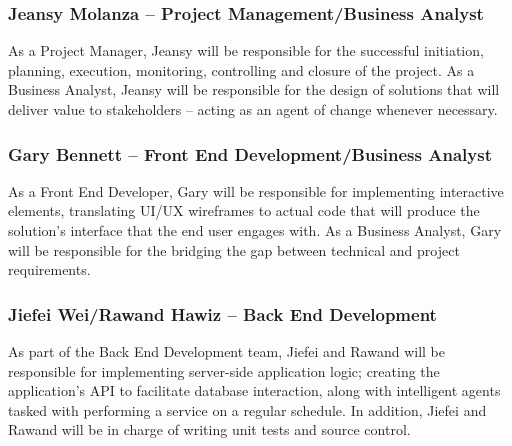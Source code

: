 \subsubsection{Jeansy Molanza -- Project Management/Business Analyst}

As a Project Manager, Jeansy will be responsible for the successful initiation, planning, execution, monitoring, controlling and closure of the project. As a Business Analyst, Jeansy will be responsible for the design of solutions that will deliver value to stakeholders -- acting as an agent of change whenever necessary.

\subsubsection{Gary Bennett -- Front End Development/Business Analyst}

As a Front End Developer, Gary will be responsible for implementing interactive elements, translating UI/UX wireframes to actual code that will produce the solution's interface that the end user engages with. As a Business Analyst, Gary will be responsible for the bridging the gap between technical and project requirements.

\subsubsection{Jiefei Wei/Rawand Hawiz -- Back End Development}

As part of the Back End Development team, Jiefei and Rawand will be responsible for implementing server-side application logic; creating the application's API to facilitate database interaction, along with intelligent agents tasked with performing a service on a regular schedule. In addition, Jiefei and Rawand will be in charge of writing unit tests and source control.